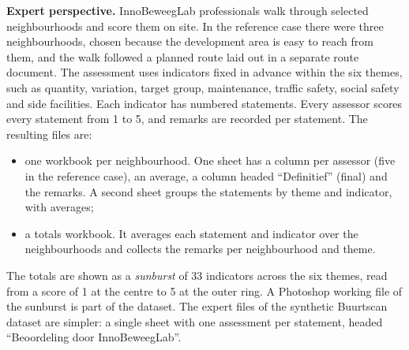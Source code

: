 \textbf{Expert perspective.} InnoBeweegLab professionals walk through selected neighbourhoods and score them on site. In the reference case there were three neighbourhoods, chosen because the development area is easy to reach from them, and the walk followed a planned route laid out in a separate route document. The assessment uses indicators fixed in advance within the six themes, such as quantity, variation, target group, maintenance, traffic safety, social safety and side facilities. Each indicator has numbered statements. Every assessor scores every statement from 1 to 5, and remarks are recorded per statement. The resulting files are:
\begin{itemize}
\item one workbook per neighbourhood. One sheet has a column per assessor (five in the reference case), an average, a column headed \textquotedblleft{}Definitief\textquotedblright{} (final) and the remarks. A second sheet groups the statements by theme and indicator, with averages;
\item a totals workbook. It averages each statement and indicator over the neighbourhoods and collects the remarks per neighbourhood and theme.
\end{itemize}
The totals are shown as a \textit{sunburst} of 33 indicators across the six themes, read from a score of 1 at the centre to 5 at the outer ring. A Photoshop working file of the sunburst is part of the dataset. The expert files of the synthetic Buurtscan dataset are simpler: a single sheet with one assessment per statement, headed \textquotedblleft{}Beoordeling door InnoBeweegLab\textquotedblright{}.

